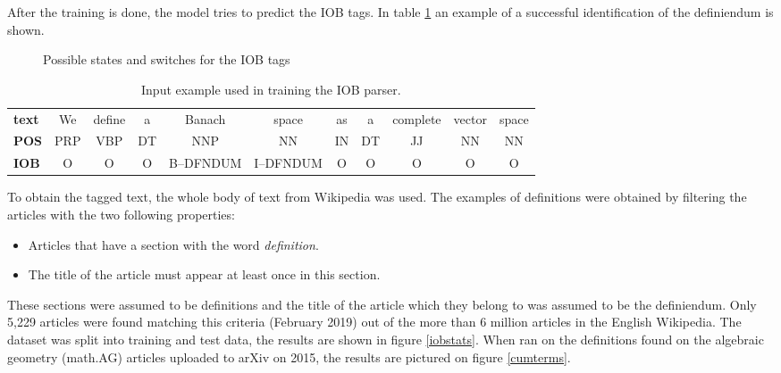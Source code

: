 \documentclass[a4paper]{easychair}
\begin{document}
After the training  is done, the model tries to predict the IOB tags. In table \ref{iobtags} an example of a successful identification of the definiendum is shown.
 \begin{figure}[h]
     \centering
{}
     \caption{\label{iobfsm} Possible states and switches for the IOB tags}
\end{figure}



\begin{table}[h]
    \begin{center}
        {\scriptsize
        \begin{tabular}{lcccccccccc}
        \hline
            \textbf{text} &We & define & a & Banach & space & as & a & complete & vector & space \\
            \textbf{POS}&PRP & VBP & DT & NNP & NN & IN & DT & JJ & NN & NN\\
            \textbf{IOB} & O& O& O& B--DFNDUM & I--DFNDUM & O& O& O& O& O \\
         \hline
    \end{tabular}
        \caption{\label{iobtags} Input example used in  training the IOB parser.}}
    \end{center} 
\end{table}

To obtain the tagged text, the whole body of text from Wikipedia was used. The examples of definitions were obtained by filtering the articles with the two following properties:
\begin{itemize}
    \item Articles that have a section with the word \textit{definition}.
    \item The title of the article must appear at least once in this section.
\end{itemize}
These sections were assumed to be definitions and the title of the article which they belong to was assumed to be the definiendum.  Only 5,229 articles were found matching this criteria (February 2019) out of the more than 6 million articles in the English Wikipedia. The dataset was split into training and test data, the results are shown in figure \ref{iobstats}. When ran on the definitions found on the algebraic geometry (math.AG) articles uploaded to arXiv on 2015, the results are pictured on figure \ref{cumterms}.
\end{document}
